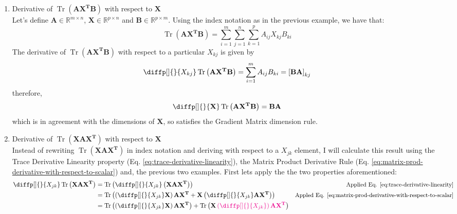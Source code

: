 \documentclass[12pt]{article}
\newcommand{\mat}[1]{\mathbf{#1}}
\newcommand{\brac}[1]{\left[#1\right]} %
\newcommand{\parentheses}[1]{\left(#1\right)}
\newcommand{\Sum}[3][i]{\sum\limits_{#1 = #2}^{#3}}
\newcommand{\R}{\mathbb{R}}
\DeclareMathOperator{\Tr}{Tr}
\newcommand{\magenta}[1]{\color{magenta}#1\color{black}}
\begin{document}
\begin{enumerate}
    \item Derivative of $\Tr\parentheses{\mat{A X^T B}}$ with respect to $\mat{X}$\\
    Let's define $\mat{A} \in \R^{m\times n}$, $\mat{X} \in \R^{p\times n}$ and $\mat{B} \in \R^{p\times m}$. Using the index notation as in the previous example, we have that:
    \begin{equation*}
        \Tr\parentheses{\mat{A X^T B}} = \Sum{1}{m}\Sum[j]{1}{n}\Sum[k]{1}{p} A_{ij} X_{kj} B_{ki}
    \end{equation*}
    The derivative of $\Tr\parentheses{\mat{AX^TB}}$ with respect to a particular $X_{kj}$ is given by
    \begin{equation}
        \diffp[]{}{X_{kj}} \Tr\parentheses{\mat{AX^TB}} = \Sum{1}{m} A_{ij} B_{ki} = \brac{\mat{B A}}_{kj}
        \label{eq:trace-ax^tb-derivative-with-respect-to-scalar}
    \end{equation}
    therefore,
    \begin{equation}
        \diffp[]{}{\mat{X}} \Tr\parentheses{\mat{AX^TB}} = \mat{B A}
        \label{eq:trace-ax^tb-derivative}
    \end{equation}
    which is in agreement with the dimensions of $\mat{X}$, so satisfies the Gradient Matrix dimension rule.
    \item Derivative of $\Tr\parentheses{\mat{X A X^T}}$ with respect to $\mat{X}$\\
    Instead of rewriting $\Tr\parentheses{\mat{X A X^T}}$ in index notation and deriving with respect to a $X_{jk}$ element, I will calculate this result using the Trace Derivative Linearity property (Eq. \ref{eq:trace-derivative-linearity}), the Matrix Product Derivative Rule (Eq. \ref{eq:matrix-prod-derivative-with-respect-to-scalar}) and, the previous two examples.
    First lets apply the the two properties aforementioned:
    \begin{equation*}
        \begin{aligned}
            \diffp[]{}{X_{jk}} \Tr\parentheses{\mat{X A X^T}} &= \Tr\parentheses{\diffp[]{}{X_{jk}} \parentheses{\mat{X A X^T}}} & \text{\small Applied Eq. \ref{eq:trace-derivative-linearity}}\\
            &= \Tr\parentheses{\parentheses{\diffp[]{}{X_{jk}} \mat{X}} \mat{A X^T} + \mat{X}\parentheses{\diffp[]{}{X_{jk}} \mat{A X^T}}} & \text{\small Appled Eq. \ref{eq:matrix-prod-derivative-with-respect-to-scalar}}\\
            &= \Tr\parentheses{\parentheses{\diffp[]{}{X_{jk}} \mat{X}} \mat{A X^T}} + \Tr\parentheses{\mat{X}\magenta{\parentheses{\diffp[]{}{X_{jk}}} \mat{A X^T}}}\\

\end{aligned}
\end{equation*}
\end{enumerate}
\end{document}

